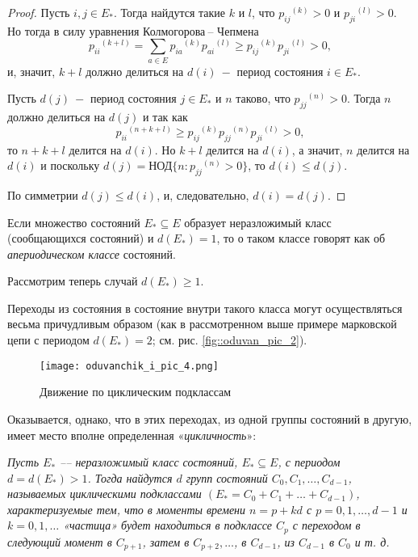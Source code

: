 \begin{proof}
Пусть $i, j \in E_*$. Тогда найдутся такие $k$ и $l$, что ${p_{ij}}^{(k)} > 0$ и ${p_{ji}}^{(l)} > 0$. Но тогда в силу уравнения Колмогорова$~–$ Чепмена
\[{p_{ii}}^{(k + l)} = \sum_{a \in E} {p_{ia}}^{(k)} {p_{ai}}^{(l)} \geq {p_{ij}}^{(k)} {p_{ji}}^{(l)} > 0,\]
и, значит, $k + l$ должно делиться на $d(i)~-$ период состояния $i \in E_*$.

Пусть $d(j)~-$ период состояния $j \in E_*$ и $n$ таково, что ${p_{jj}}^{(n)} > 0$. Тогда $n$ должно делиться на $d(j)$ и так как
\[{p_{ii}}^{(n + k + l)} \geq {p_{ij}}^{(k)} {p_{jj}}^{(n)} {p_{ji}}^{(l)} > 0,\]
то $n + k + l$ делится на $d(i)$. Но $k + l$ делится на $d(i)$, а значит, $n$ делится на $d(i)$ и поскольку $d(j) = \text{НОД}\{ n: {p_{jj}}^{(n)} > 0\}$, то $d(i) \leq d(j)$.

По симметрии $d(j) \leq d(i)$, и, следовательно, $d(i) = d(j)$.
\end{proof}

Если множество состояний $E_* \subseteq E$ образует неразложимый класс
(сообщающихся состояний) и $d(E_*) = 1$, то о таком классе говорят как об
\emph{апериодическом классе} состояний.

Рассмотрим теперь случай $d(E_*) \geq 1$.

Переходы из состояния в состояние внутри такого класса могут осуществляться весьма причудливым образом (как в рассмотренном выше примере марковской цепи с периодом $d(E_*) =2$; см. рис. \ref{fig::oduvan_pic_2}).

\begin{wrapfigure}{r}{0.4\textwidth}
                \centering
			\texttt{[image: oduvanchik\_i\_pic\_4.png]}
			\caption{Движение по циклическим подклассам}
			\label{fig::oduvan_cycle_motion}
\end{wrapfigure}
Оказывается, однако, что в этих переходах, из одной группы состояний в другую, имеет место вполне определенная «\emph{цикличность}»:


\begin{theorem} \emph{Пусть $E_*$ –– неразложимый класс состояний, $E_* \subseteq E$, с периодом $d = d(E_*) > 1$. Тогда найдутся $d$ групп состояний $C_0, C_1, \ldots , C_{d-1}$, называемых циклическими подклассами $(E_* = C_0 + C_1 + \ldots + C_{d-1})$, характеризуемые тем, что в моменты времени $n = p + kd$ с $p = 0, 1, \ldots , d - 1$ и
$k=0, 1, \ldots$ «частица» будет находиться в подклассе $C_p$ с переходом
в следующий момент в $C_{p+1}$, затем в $C_{p+2}, \ldots$, в $C_{d - 1}$, из $C_{d-1}$ в $C_0$ и т. д.}
\end{theorem}


